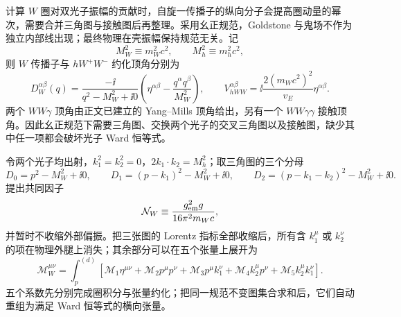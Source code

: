 \begin{derivation}
计算 $W$ 圈对双光子振幅的贡献时，自旋一传播子的纵向分子会提高圈动量的幂次，需要合并三角图与接触图后再整理。采用幺正规范，Goldstone 与鬼场不作为独立内部线出现；最终物理在壳振幅保持规范无关。记
\[
M_W^2\equiv m_W^2c^2,\qquad M_h^2\equiv m_h^2c^2,
\]
则 $W$ 传播子与 $hW^+W^-$ 约化顶角分别为
\begin{equation*}
 D_W^{\alpha\beta}(q)
 =\frac{-\ii}{q^2-M_W^2+\ii0}
 \left(\eta^{\alpha\beta}-\frac{q^\alpha q^\beta}{M_W^2}\right),
 \qquad
 V_{hWW}^{\alpha\beta}=\ii\frac{2(m_Wc^2)^2}{v_E}\eta^{\alpha\beta}.
\end{equation*}
两个 $WW\gamma$ 顶角由正文已建立的 Yang--Mills 顶角给出，另有一个 $WW\gamma\gamma$ 接触顶角。因此幺正规范下需要三角图、交换两个光子的交叉三角图以及接触图，缺少其中任一项都会破坏光子 Ward 恒等式。

令两个光子均出射，$k_1^2=k_2^2=0$，$2k_1\!\cdot k_2=M_h^2$；取三角图的三个分母
\begin{equation*}
D_0=p^2-M_W^2+\ii0,\qquad
D_1=(p-k_1)^2-M_W^2+\ii0,\qquad
D_2=(p-k_1-k_2)^2-M_W^2+\ii0.
\end{equation*}
提出共同因子
\begin{equation*}
\mathcal N_W\equiv\frac{g_{\rm em}^2g}{16\pi^2m_Wc},
\end{equation*}
并暂时不收缩外部偏振。把三张图的 Lorentz 指标全部收缩后，所有含 $k_1^\mu$ 或 $k_2^\nu$ 的项在物理外腿上消失；其余部分可以在五个张量上展开为
\begin{equation*}
\mathcal M_W^{\mu\nu}
=\int_p^{(d)}\!
\left[
\mathscr M_1\eta^{\mu\nu}
+\mathscr M_2p^\mu p^\nu
+\mathscr M_3p^\mu k_1^\nu
+\mathscr M_4k_2^\mu p^\nu
+\mathscr M_5k_2^\mu k_1^\nu
\right].
\end{equation*}
五个系数先分别完成圈积分与张量约化；把同一规范不变图集合求和后，它们自动重组为满足 Ward 恒等式的横向张量。


\end{derivation}

